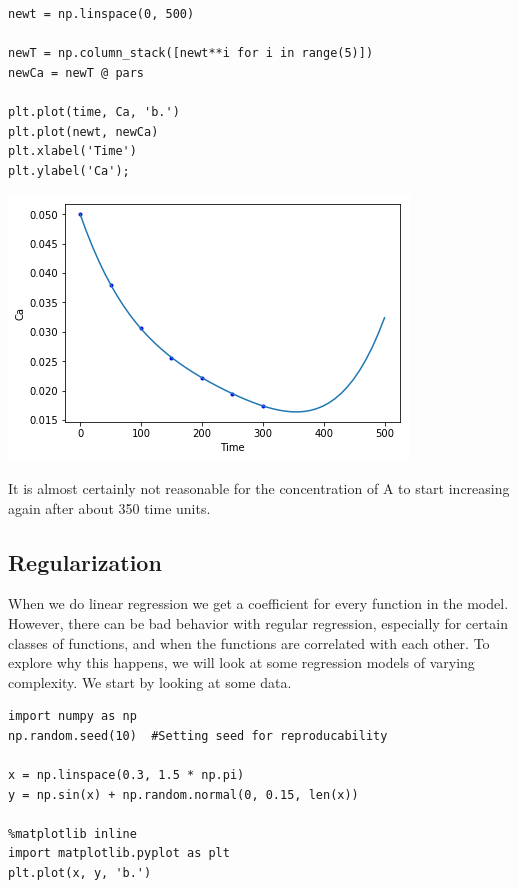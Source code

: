 \documentclass[11pt]{article}
\begin{document}
\begin{verbatim}
newt = np.linspace(0, 500)

newT = np.column_stack([newt**i for i in range(5)])
newCa = newT @ pars

plt.plot(time, Ca, 'b.')
plt.plot(newt, newCa)
plt.xlabel('Time')
plt.ylabel('Ca');
\end{verbatim}

\begin{center}
\includegraphics[width=.9\linewidth]{obipy-resources/d00b1703e45a1bb2f86b06f32bba01b8-196735Ky.png}
\end{center}

It is almost certainly not reasonable for the concentration of A to start increasing again after about 350 time units.

\subsection{Regularization}
\label{sec:orgfe38434}

When we do linear regression we get a coefficient for every function in the model. However, there can be bad behavior with regular regression, especially for certain classes of functions, and when the functions are correlated with each other. To explore why this happens, we will look at some regression models of varying complexity. We start by looking at some data.

\begin{verbatim}
import numpy as np
np.random.seed(10)  #Setting seed for reproducability

x = np.linspace(0.3, 1.5 * np.pi)
y = np.sin(x) + np.random.normal(0, 0.15, len(x))

%matplotlib inline
import matplotlib.pyplot as plt
plt.plot(x, y, 'b.')
\end{verbatim}
\end{document}
